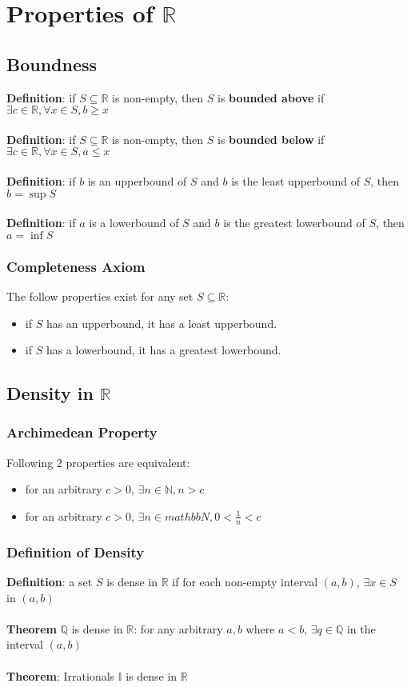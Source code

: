 \documentclass{article}
\begin{document}
  \section{Properties of $\mathbb{R}$}
  \subsection{Boundness}
  \textbf{Definition}: if $S \subseteq \mathbb{R}$ is non-empty, then $S$ is \textbf{bounded above} if $\exists c \in \mathbb{R}, \forall x \in S, b \geq x$ \\ \\
  \textbf{Definition}: if $S \subseteq \mathbb{R}$ is non-empty, then $S$ is \textbf{bounded below} if $\exists c \in \mathbb{R}, \forall x \in S, a \leq x$ \\ \\
  \textbf{Definition}: if $b$ is an upperbound of $S$ and $b$ is the least upperbound of $S$, then $b = \sup{S}$ \\ \\
  \textbf{Definition}: if $a$ is a lowerbound of $S$ and $b$ is the greatest lowerbound of $S$, then $a = \inf{S}$
  \subsubsection{Completeness Axiom}
  The follow properties exist for any set $S \subseteq \mathbb{R}$:
  \begin{itemize}
    \item if $S$ has an upperbound, it has a least upperbound.
    \item if $S$ has a lowerbound, it has a greatest lowerbound.
  \end{itemize}
  \subsection{Density in $\mathbb{R}$}
  \subsubsection{Archimedean Property}
  Following 2 properties are equivalent:
  \begin{itemize}
    \item for an arbitrary $c > 0$, $\exists n \in \mathbb{N}, n > c$ 
    \item for an arbitrary $c > 0$, $\exists n \in mathbb{N}, 0 < \frac{1}{n} < c$
  \end{itemize}
  \subsubsection{Definition of Density}
  \textbf{Definition}: a set $S$ is dense in $\mathbb{R}$ if for each non-empty interval $(a, b)$, $\exists x \in S$ in $(a,b)$  \\ \\
  \textbf{Theorem} $\mathbb{Q}$ is dense in $\mathbb{R}$: for any arbitrary $a,b$ where $a < b$, $\exists q \in \mathbb{Q}$ in the interval $(a,b)$ \\ \\
  \textbf{Theorem}: Irrationals $\mathbb{I}$ is dense in $\mathbb{R}$
\end{document}
